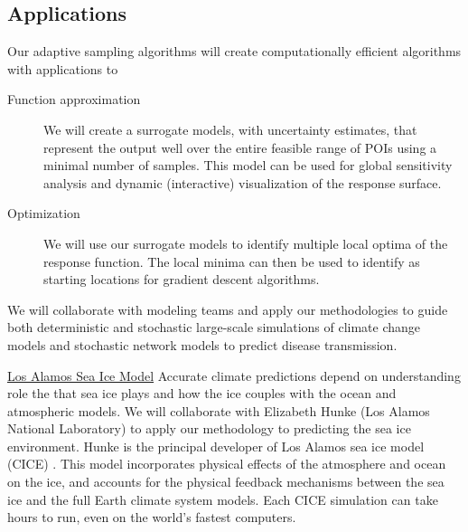 \documentclass[11pt]{NSFamsart}
\begin{document}
\subsection{Applications}
Our adaptive sampling algorithms will create  computationally efficient algorithms with applications to 
\renewcommand{\descriptionlabel}[1]{\hspace{\labelsep}\textit{#1}.}
\begin{description}
\item[Function approximation] We will create a surrogate models, with uncertainty estimates, that represent the output well over the entire feasible range of POIs using a minimal number of samples.  This model can be used for global sensitivity analysis and dynamic (interactive) visualization of the response surface. 
\item[Optimization] We will use our surrogate models to identify multiple local optima of the response function.  The local minima can then be used to identify as starting locations for gradient descent algorithms.
\end{description}

We will collaborate with modeling teams and apply our methodologies to guide both deterministic and stochastic large-scale simulations of climate change models and stochastic network models to predict disease transmission. 


\underline{Los Alamos Sea Ice Model}
Accurate climate predictions depend on understanding role the that sea ice plays and how the ice couples with the ocean and atmospheric models.
We will collaborate with Elizabeth Hunke (Los Alamos National Laboratory) to apply our methodology to predicting the sea ice environment.   Hunke is the principal developer of  Los Alamos sea ice model (CICE) \cite{hunke2017cice, hunke2010cice}. This model incorporates physical effects of the atmosphere and ocean on the ice, and accounts for the physical feedback mechanisms between the sea ice and the full Earth climate system models. Each CICE simulation can take hours to run, even on the world's fastest computers.
\end{document}

